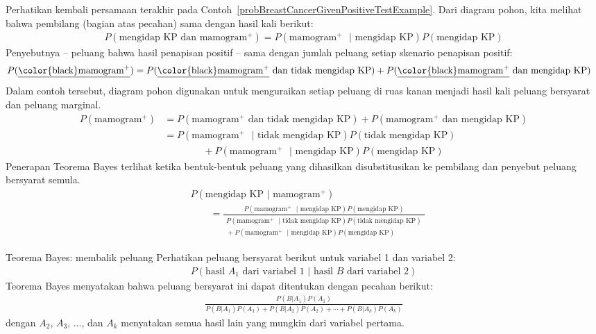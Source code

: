 Perhatikan kembali persamaan terakhir pada Contoh~\ref{probBreastCancerGivenPositiveTestExample}.
Dari diagram pohon, kita melihat bahwa pembilang (bagian atas pecahan) sama dengan hasil kali berikut:
\begin{align*}
P(\text{mengidap KP dan mamogram$^+$}) = P(\text{mamogram$^+$ } | \text{ mengidap KP})P(\text{mengidap KP})
\end{align*}
Penyebutnya -- peluang bahwa hasil penapisan positif -- sama dengan jumlah peluang setiap skenario penapisan positif:
\begin{align*}
P(\text{\underline{\color{black}mamogram$^+$}})
	&= P(\text{\underline{\color{black}mamogram$^+$} dan tidak mengidap KP})
		+ P(\text{\underline{\color{black}mamogram$^+$} dan mengidap KP})
\end{align*}
Dalam contoh tersebut, diagram pohon digunakan untuk menguraikan setiap peluang di ruas kanan menjadi hasil kali peluang bersyarat dan peluang marginal.
\begin{align*}
P(\text{mamogram$^+$})
	&= P(\text{mamogram$^+$ dan tidak mengidap KP}) + P(\text{mamogram$^+$ dan mengidap KP}) \\
	&= P(\text{mamogram$^+$ } | \text{ tidak mengidap KP})P(\text{tidak mengidap KP}) \\
			   &\qquad\qquad + P(\text{mamogram$^+$ } | \text{ mengidap KP})P(\text{mengidap KP})
\end{align*}
Penerapan Teorema Bayes terlihat ketika bentuk-bentuk peluang yang dihasilkan disubstitusikan ke pembilang dan penyebut peluang bersyarat semula.
\begin{align*}
& P(\text{mengidap KP } | \text{ mamogram$^+$})  \\
& \qquad= \frac{P(\text{mamogram$^+$ } | \text{ mengidap KP})P(\text{mengidap KP})}
	{\begin{gathered}
	 P(\text{mamogram$^+$ } | \text{ tidak mengidap KP})P(\text{tidak mengidap KP}) \\
	 {}+P(\text{mamogram$^+$ } | \text{ mengidap KP})P(\text{mengidap KP})
	 \end{gathered}}
\end{align*}

\begin{onebox}{Teorema Bayes: membalik peluang}
Perhatikan peluang bersyarat berikut untuk variabel 1 dan variabel 2:\vspace{-1.5mm}
\begin{align*}
P(\text{hasil $A_1$ dari variabel 1 } | \text{ hasil $B$ dari variabel 2})
\end{align*}
Teorema Bayes menyatakan bahwa peluang bersyarat ini dapat ditentukan dengan pecahan berikut:\vspace{-1.5mm}
\begin{align*}
\frac{P(B | A_1) P(A_1)}
	{P(B | A_1) P(A_1) + P(B | A_2) P(A_2) + \cdots + P(B | A_k) P(A_k)}
\end{align*}
dengan $A_2$, $A_3$, ..., dan $A_k$ menyatakan semua hasil lain yang mungkin dari variabel pertama.
\end{onebox}

